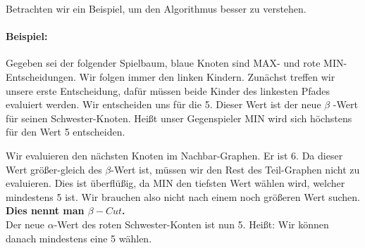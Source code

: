 Betrachten wir ein Beispiel, um den Algorithmus besser zu verstehen.

\paragraph{Beispiel:}

Gegeben sei der folgender Spielbaum, blaue Knoten sind MAX- und rote MIN-Entscheidungen.
Wir folgen immer den linken Kindern. Zunächst treffen wir unsere erste Entscheidung, dafür müssen beide Kinder des linkesten Pfades evaluiert werden.
Wir entscheiden uns für die 5. Dieser Wert ist der neue $\beta$ -Wert für seinen Schwester-Knoten. Heißt unser Gegenspieler MIN wird sich höchstens für den Wert 5 entscheiden.

\begin{center}
\end{center}

Wir evaluieren den nächsten Knoten im Nachbar-Graphen. Er ist 6. Da dieser Wert größer-gleich des $\beta$-Wert ist, müssen wir den Rest des Teil-Graphen nicht zu evaluieren. Dies ist überflüßig, da MIN den tiefsten Wert wählen wird, welcher mindestens 5 ist. Wir brauchen also nicht nach einem noch größeren Wert suchen. \\
\textbf{Dies nennt man $\beta-Cut$.} \\
Der neue $\alpha$-Wert des roten Schwester-Konten ist nun 5. Heißt: Wir können danach mindestens eine 5 wählen.

\begin{center}
\end{center}

